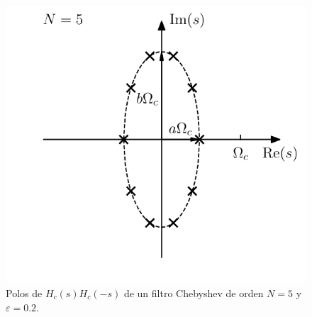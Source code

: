\documentclass[a4paper]{report}
\begin{document}
\begin{figure}[!htb]
  \begin{minipage}[c]{0.45\textwidth}
    \includegraphics[width=\textwidth]{figuras/continuous_filters_chebyshev_poles.pdf}
  \end{minipage}\hfill
  \begin{minipage}[c]{0.45\textwidth}
    \caption{
      Polos de \(H_c(s)H_c(-s)\) de un filtro Chebyshev de orden \(N=5\) y \(\varepsilon=0.2\).
    }\label{fig:continuous_filters_chebyshev_poles}
  \end{minipage}
\end{figure}
\end{document}
